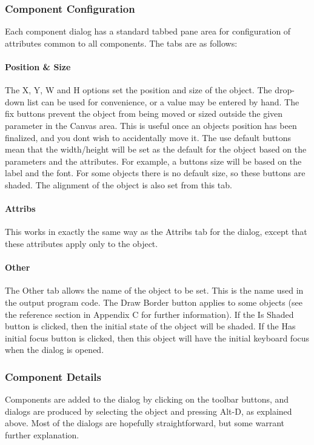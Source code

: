 \subsubsection{Component Configuration}

Each component dialog has a standard tabbed pane area for configuration
of attributes common to all components. The tabs are as follows:

\paragraph{Position \& Size}
The X, Y, W and H options set the position and size of the object. The
drop-down list can be used for convenience, or a value may be entered
by hand. The {\textquotedbl}fix{\textquotedbl} buttons prevent the
object from being moved or sized outside the given parameter in the
Canvas area. This is useful once an object{\textquotesingle}s position
has been finalized, and you don{\textquotesingle}t wish to accidentally
move it. The {\textquotedbl}use default{\textquotedbl} buttons mean
that the width/height will be set as the default for the object based
on the parameters and the attributes. For example, a
button{\textquotesingle}s size will be based on the label and the font.
For some objects there is no default size, so these buttons are shaded.
The alignment of the object is also set from this tab.

\paragraph{Attribs}
This works in exactly the same way as the Attribs tab for the dialog,
except that these attributes apply only to the object.

\paragraph{Other}
The Other tab allows the name of the object to be set. This is the name
used in the output program code. The {\textquotedbl}Draw
Border{\textquotedbl} button applies to some objects (see the reference
section in Appendix C for further information). If the
{\textquotedbl}Is Shaded{\textquotedbl} button is clicked, then the
initial state of the object will be shaded. If the {\textquotedbl}Has
initial focus{\textquotedbl} button is clicked, then this object will
have the initial keyboard focus when the dialog is
opened.

\subsubsection[Component Details]{Component Details}
Components are added to the dialog by clicking on the toolbar buttons,
and dialogs are produced by selecting the object and pressing Alt-D, as
explained above. Most of the dialogs are hopefully straightforward, but
some warrant further explanation.


